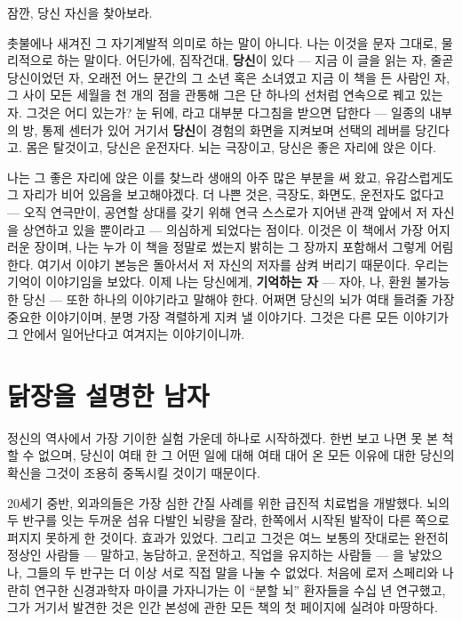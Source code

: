 잠깐, 당신 자신을 찾아보라.

촛불에나 새겨진 그 자기계발적 의미로 하는 말이 아니다. 나는 이것을 문자 그대로, 물리적으로 하는 말이다. 어딘가에, 짐작건대, \textbf{당신}이 있다 — 지금 이 글을 읽는 자, 줄곧 당신이었던 자, 오래전 어느 문간의 그 소년 혹은 소녀였고 지금 이 책을 든 사람인 자, 그 사이 모든 세월을 천 개의 점을 관통해 그은 단 하나의 선처럼 연속으로 꿰고 있는 자. 그것은 어디 있는가? 눈 뒤에, 라고 대부분 다그침을 받으면 답한다 — 일종의 내부의 방, 통제 센터가 있어 거기서 \textbf{당신}이 경험의 화면을 지켜보며 선택의 레버를 당긴다고. 몸은 탈것이고, 당신은 운전자다. 뇌는 극장이고, 당신은 좋은 자리에 앉은 이다.

나는 그 좋은 자리에 앉은 이를 찾느라 생애의 아주 많은 부분을 써 왔고, 유감스럽게도 그 자리가 비어 있음을 보고해야겠다. 더 나쁜 것은, 극장도, 화면도, 운전자도 없다고 — 오직 연극만이, 공연할 상대를 갖기 위해 연극 스스로가 지어낸 관객 앞에서 저 자신을 상연하고 있을 뿐이라고 — 의심하게 되었다는 점이다. 이것은 이 책에서 가장 어지러운 장이며, 나는 누가 이 책을 정말로 썼는지 밝히는 그 장까지 포함해서 그렇게 어림한다. 여기서 이야기 본능은 돌아서서 저 자신의 저자를 삼켜 버리기 때문이다. 우리는 기억이 이야기임을 보았다. 이제 나는 당신에게, \textbf{기억하는 자} — 자아, 나, 환원 불가능한 당신 — 또한 하나의 이야기라고 말해야 한다. 어쩌면 당신의 뇌가 여태 들려줄 가장 중요한 이야기이며, 분명 가장 격렬하게 지켜 낼 이야기다. 그것은 다른 모든 이야기가 그 안에서 일어난다고 여겨지는 이야기이니까.

\section*{닭장을 설명한 남자}

정신의 역사에서 가장 기이한 실험 가운데 하나로 시작하겠다. 한번 보고 나면 못 본 척할 수 없으며, 당신이 여태 한 그 어떤 일에 대해 여태 대어 온 모든 이유에 대한 당신의 확신을 그것이 조용히 중독시킬 것이기 때문이다.

20세기 중반, 외과의들은 가장 심한 간질 사례를 위한 급진적 치료법을 개발했다. 뇌의 두 반구를 잇는 두꺼운 섬유 다발인 뇌량을 잘라, 한쪽에서 시작된 발작이 다른 쪽으로 퍼지지 못하게 한 것이다. 효과가 있었다. 그리고 그것은 여느 보통의 잣대로는 완전히 정상인 사람들 — 말하고, 농담하고, 운전하고, 직업을 유지하는 사람들 — 을 낳았으나, 그들의 두 반구는 더 이상 서로 직접 말을 나눌 수 없었다. 처음에 로저 스페리와 나란히 연구한 신경과학자 마이클 가자니가는 이 ``분할 뇌'' 환자들을 수십 년 연구했고, 그가 거기서 발견한 것은 인간 본성에 관한 모든 책의 첫 페이지에 실려야 마땅하다.

